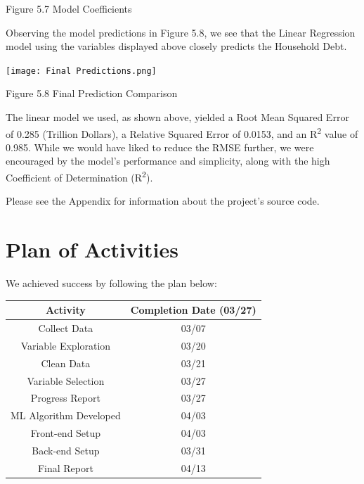 \documentclass[sigconf,nonacm,11pt]{acmart}
\begin{document}
\begin{center} Figure 5.7 Model Coefficients \end{center}

Observing the model predictions in Figure 5.8, we see that the Linear Regression model using the variables displayed above closely predicts the Household Debt.

\texttt{[image: Final Predictions.png]}
\begin{center}Figure 5.8 Final Prediction Comparison \end{center}
The linear model we used, as shown above, yielded a Root Mean Squared Error of 0.285 (Trillion Dollars), a Relative Squared Error of 0.0153, and an R\textsuperscript{2} value of 0.985.  While we would have liked to reduce the RMSE further, we were encouraged by the model's performance and simplicity, along with the high Coefficient of Determination (R\textsuperscript{2}).


Please see the Appendix for information about the project's source code.

\section{Plan of Activities}

We achieved success by following the plan below:\vspace{0.07em}
\begin{center}
    \begin{tabular}{||c|c||}
    \hline
    Activity & Completion Date (03/27)\\
    \hline\hline
    Collect Data & 03/07\\
    Variable Exploration & 03/20\\
    Clean Data & 03/21\\
    Variable Selection & 03/27\\
    Progress Report & 03/27\\
    ML Algorithm Developed & 04/03\\
    Front-end Setup & 04/03\\
    Back-end Setup & 03/31\\
    Final Report & 04/13\\
    \hline
    \end{tabular}
\end{center}
\end{document}
